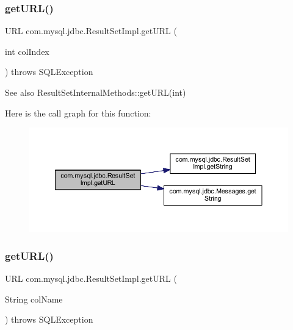 \subsubsection{\texorpdfstring{get\+U\+R\+L()}{getURL()}\hspace{0.1cm}{\footnotesize\ttfamily [1/2]}}
{\footnotesize\ttfamily U\+RL com.\+mysql.\+jdbc.\+Result\+Set\+Impl.\+get\+U\+RL (\begin{DoxyParamCaption}\item[{int}]{col\+Index }\end{DoxyParamCaption}) throws S\+Q\+L\+Exception}

\begin{DoxySeeAlso}{See also}
Result\+Set\+Internal\+Methods\+::get\+U\+R\+L(int) 
\end{DoxySeeAlso}
Here is the call graph for this function\+:
\nopagebreak
\begin{figure}[H]
\begin{center}
\leavevmode
\includegraphics[width=350pt]{classcom_1_1mysql_1_1jdbc_1_1_result_set_impl_a71ffe1e2049d4670597626e4dd6c7a63_cgraph}
\end{center}
\end{figure}
\mbox{\label{classcom_1_1mysql_1_1jdbc_1_1_result_set_impl_acbd852b20d25a94e3c4ba7b9612c65ed}} 
\subsubsection{\texorpdfstring{get\+U\+R\+L()}{getURL()}\hspace{0.1cm}{\footnotesize\ttfamily [2/2]}}
{\footnotesize\ttfamily U\+RL com.\+mysql.\+jdbc.\+Result\+Set\+Impl.\+get\+U\+RL (\begin{DoxyParamCaption}\item[{String}]{col\+Name }\end{DoxyParamCaption}) throws S\+Q\+L\+Exception}


